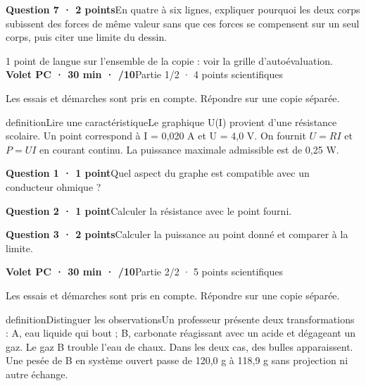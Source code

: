 \par\addvspace{3mm}\noindent\textbf{Question 7 · 2 points}\quad En quatre à six lignes, expliquer pourquoi les deux corps subissent des forces de même valeur sans que ces forces se compensent sur un seul corps, puis citer une limite du dessin.\par
\vfill{}
{\small 1 point de langue sur l’ensemble de la copie : voir la grille d’autoévaluation.}
\label{bb-10}
\noindent\textbf{Volet PC · 30 min · /10}\hfill Partie 1/2 · 4 points scientifiques
\par\vspace{2mm}Les essais et démarches sont pris en compte. Répondre sur une copie séparée.\par
\begin{pcEncadre}{definition}{Lire une caractéristique}Le graphique U(I) provient d’une résistance scolaire. Un point correspond à I = 0,020 A et U = 4,0 V. On fournit $U=RI$ et $P=UI$ en courant continu. La puissance maximale admissible est de 0,25 W.\end{pcEncadre}
\par\addvspace{3mm}\noindent\textbf{Question 1 · 1 point}\quad Quel aspect du graphe est compatible avec un conducteur ohmique ?\par
\par\addvspace{3mm}\noindent\textbf{Question 2 · 1 point}\quad Calculer la résistance avec le point fourni.\par
\par\addvspace{3mm}\noindent\textbf{Question 3 · 2 points}\quad Calculer la puissance au point donné et comparer à la limite.\par
\vfill{}
\noindent\textbf{Volet PC · 30 min · /10}\hfill Partie 2/2 · 5 points scientifiques
\par\vspace{2mm}Les essais et démarches sont pris en compte. Répondre sur une copie séparée.\par
\begin{pcEncadre}{definition}{Distinguer les observations}Un professeur présente deux transformations : A, eau liquide qui bout ; B, carbonate réagissant avec un acide et dégageant un gaz. Le gaz B trouble l’eau de chaux. Dans les deux cas, des bulles apparaissent. Une pesée de B en système ouvert passe de 120,0 g à 118,9 g sans projection ni autre échange.\end{pcEncadre}
